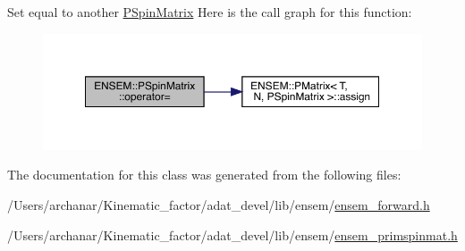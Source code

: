 Set equal to another \mbox{\hyperlink{classENSEM_1_1PSpinMatrix}{P\+Spin\+Matrix}} Here is the call graph for this function\+:
\nopagebreak
\begin{figure}[H]
\begin{center}
\leavevmode
\includegraphics[width=350pt]{d0/d1e/classENSEM_1_1PSpinMatrix_a0346425dd32cab35d2f76c9d5cca8533_cgraph}
\end{center}
\end{figure}


The documentation for this class was generated from the following files\+:\begin{DoxyCompactItemize}
\item 
/\+Users/archanar/\+Kinematic\+\_\+factor/adat\+\_\+devel/lib/ensem/\mbox{\hyperlink{lib_2ensem_2ensem__forward_8h}{ensem\+\_\+forward.\+h}}\item 
/\+Users/archanar/\+Kinematic\+\_\+factor/adat\+\_\+devel/lib/ensem/\mbox{\hyperlink{lib_2ensem_2ensem__primspinmat_8h}{ensem\+\_\+primspinmat.\+h}}\end{DoxyCompactItemize}
